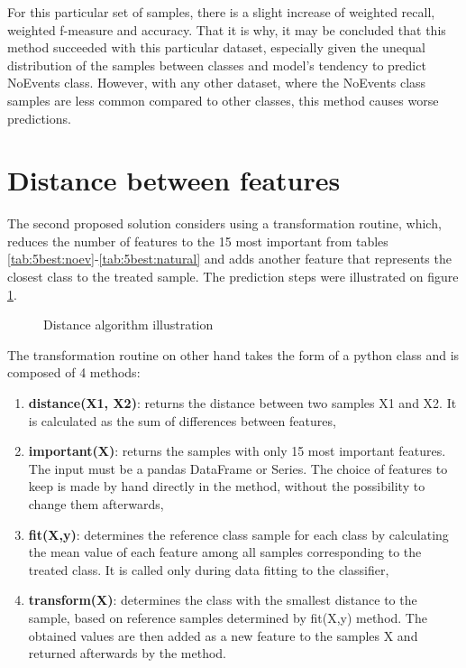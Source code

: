 For this particular set of samples, there is a slight increase of weighted recall, weighted f-measure and accuracy. That it is why, it may be concluded that this method succeeded with this particular dataset, especially given the unequal distribution of the samples between classes and model's tendency to predict NoEvents class. However, with any other dataset, where the NoEvents class samples are less common compared to other classes, this method causes worse predictions.

\section{Distance between features}
The second proposed solution considers using a transformation routine, which, reduces the number of features to the 15 most important from tables \ref{tab:5best:noev}-\ref{tab:5best:natural} and adds another feature that represents the closest class to the treated sample. The prediction steps were illustrated on figure \ref{fig:distill}.

\begin{figure}[H]
    \centering
    \caption{Distance algorithm illustration}
    \label{fig:distill}
\end{figure}

The transformation routine on other hand takes the form of a python class and is composed of 4 methods:
\begin{enumerate}
    \item \textbf{distance(X1, X2)}: returns the distance between two samples X1 and X2. It is calculated as the sum of differences between features,
    \item \textbf{important(X)}: returns the samples with only 15 most important features. The input must be a pandas DataFrame or Series. The choice of features to keep is made by hand directly in the method, without the possibility to change them afterwards,
    \item \textbf{fit(X,y)}: determines the reference class sample for each class by calculating the mean value of each feature among all samples corresponding to the treated class. It is called only during data fitting to the classifier,
    \item \textbf{transform(X)}: determines the class with the smallest distance to the sample, based on reference samples determined by fit(X,y) method. The obtained values are then added as a new feature to the samples X and returned afterwards by the method.
\end{enumerate}

